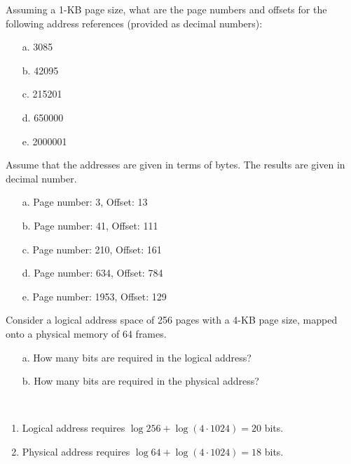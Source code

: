 \begin{exercise}[]{Assuming a 1-KB page size, what are the page numbers and offsets for
    the following address references (provided as decimal numbers):
    \begin{enumerate}
        \item [a.] 3085
        \item [b.] 42095
        \item [c.] 215201
        \item [d.] 650000
        \item [e.] 2000001
    \end{enumerate}}
  \begin{solution} Assume that the addresses are given in terms of bytes. The results are given in decimal number.
    \begin{enumerate}
    \item [a.] Page number: 3, Offset: 13
    \item [b.] Page number: 41, Offset: 	111
    \item [c.] Page number: 210, Offset: 	161
    \item [d.] Page number: 634, Offset: 	784
    \item [e.] Page number: 1953, Offset: 	129
    \end{enumerate}
  \end{solution}
  \label{ex2}
\end{exercise}


\begin{exercise}[]{Consider a logical address space of 256 pages with a 4-KB page size,
    mapped onto a physical memory of 64 frames.
    \begin{enumerate}
        \item [a.] How many bits are required in the logical address?
        \item [b.] How many bits are required in the physical address?
    \end{enumerate}}
  \begin{solution}
  \par{~}
  \begin{enumerate}
      \item Logical address requires $\log 256 + \log (4\cdot 1024) = 20$ bits.
      \item Physical address requires $\log 64 + \log (4\cdot 1024) = 18$ bits.
  \end{enumerate}
  \end{solution}
  \label{ex3}
\end{exercise}



